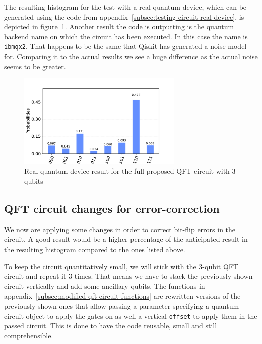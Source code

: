 The resulting histogram for the test with a real quantum device, which can be generated using the code from appendix~\ref{subsec:testing-circuit-real-device}, is depicted in figure~\ref{fig:test-histogram-real-device}.
Another result the code is outputting is the quantum backend name on which the circuit has been executed.
In this case the name is \texttt{ibmqx2}.
That happens to be the same that Qiskit has generated a noise model for.
Comparing it to the actual results we see a huge difference as the actual noise seems to be greater.

\begin{figure}[H]
    \centering
    \includegraphics[width=0.7\textwidth]{res/test-histogram-real-quantum-device.pdf}
    \caption{Real quantum device result for the full proposed QFT circuit with 3 qubits}
    \label{fig:test-histogram-real-device}
\end{figure}

\subsection{QFT circuit changes for error-correction}
\label{subsec:qft-circuit-error-correction}

We now are applying some changes in order to correct bit-flip errors in the circuit.
A good result would be a higher percentage of the anticipated result in the resulting histogram compared to the ones listed above.

To keep the circuit quantitatively small, we will stick with the 3-qubit QFT circuit and repeat it 3 times.
That means we have to stack the previously shown circuit vertically and add some ancillary qubits.
The functions in appendix~\ref{subsec:modified-qft-circuit-functions} are rewritten versions of the previously shown ones that allow passing a parameter specifying a quantum circuit object to apply the gates on as well a vertical \texttt{offset} to apply them in the passed circuit.
This is done to have the code reusable, small and still comprehensible.

